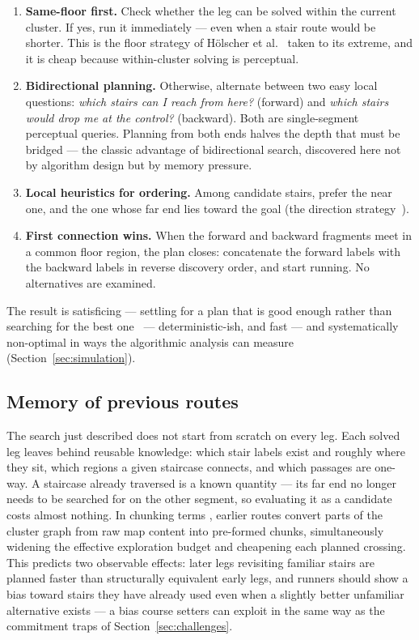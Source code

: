 \documentclass[11pt,a4paper,twocolumn]{article}
\begin{document}
\begin{enumerate}
    \item \textbf{Same-floor first.} Check whether the leg can be solved
          within the current cluster. If yes, run it immediately --- even
          when a stair route would be shorter. This is the floor strategy of
          H\"olscher et al.~\cite{holscher2006} taken to its extreme, and it
          is cheap because within-cluster solving is perceptual.
    \item \textbf{Bidirectional planning.} Otherwise, alternate between two
          easy local questions: \emph{which stairs can I reach from here?}
          (forward) and \emph{which stairs would drop me at the control?}
          (backward). Both are single-segment perceptual queries. Planning
          from both ends halves the depth that must be bridged --- the
          classic advantage of bidirectional search, discovered here not by
          algorithm design but by memory pressure.
    \item \textbf{Local heuristics for ordering.} Among candidate stairs,
          prefer the near one, and the one whose far end lies toward the
          goal (the direction strategy~\cite{holscher2006}).
    \item \textbf{First connection wins.} When the forward and backward
          fragments meet in a common floor region, the plan closes:
          concatenate the forward labels with the backward labels in reverse
          discovery order, and start running. No alternatives are examined.
\end{enumerate}

The result is satisficing --- settling for a plan that is good enough rather
than searching for the best one~\cite{simon1956} --- deterministic-ish, and
fast --- and systematically non-optimal in ways the algorithmic analysis can
measure (Section~\ref{sec:simulation}).

\subsection{Memory of previous routes}

The search just described does not start from scratch on every leg. Each
solved leg leaves behind reusable knowledge: which stair labels exist and
roughly where they sit, which regions a given staircase connects, and which
passages are one-way. A staircase already traversed is a known quantity ---
its far end no longer needs to be searched for on the other segment, so
evaluating it as a candidate costs almost nothing. In chunking terms
\cite{chase1973}, earlier routes convert parts of the cluster graph from raw
map content into pre-formed chunks, simultaneously widening the effective
exploration budget and cheapening each planned crossing. This predicts two
observable effects: later legs revisiting familiar stairs are planned faster
than structurally equivalent early legs, and runners should show a bias
toward stairs they have already used even when a slightly better unfamiliar
alternative exists --- a bias course setters can exploit in the same way as
the commitment traps of Section~\ref{sec:challenges}.
\end{document}
